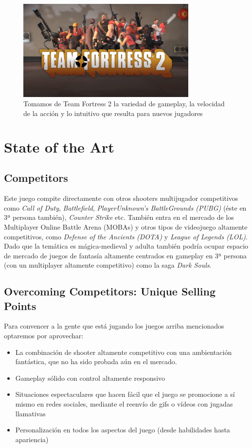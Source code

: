 \documentclass[12pt]{report}
\begin{document}
\begin{figure}[h]
    \centering
    \includegraphics[width=0.8\textwidth]{tf2}
    \caption{Tomamos de Team Fortress 2 la variedad de gameplay, la velocidad de la acción y lo intuitivo que resulta para nuevos jugadores}
\end{figure}

\section{State of the Art}

\subsection{Competitors}
Este juego compite directamente con otros shooters multijugador competitivos como \textit{Call of Duty}, \textit{Battlefield}, \textit{PlayerUnknown's BattleGrounds (PUBG)} (éste en 3ª persona también), \textit{Counter Strike} etc. También entra en el mercado de los Multiplayer Online Battle Arena (MOBAs) y otros tipos de videojuego altamente competitivos, como \textit{Defense of the Ancients (DOTA)} y \textit{League of Legends (LOL)}. Dado que la temática es mágica-medieval y adulta también podría ocupar espacio de mercado de juegos de fantasía altamente centrados en gameplay en 3ª persona (con un multiplayer altamente competitivo) como la saga \textit{Dark Souls}.

\subsection{Overcoming Competitors: Unique Selling Points}
Para convencer a la gente que está jugando los juegos arriba mencionados optaremos por aprovechar:

\begin{itemize}
\item La combinación de shooter altamente competitivo con una ambientación fantástica, que no ha sido probada aún en el mercado.
\item Gameplay sólido con control altamente responsivo
\item Situaciones espectaculares que hacen fácil que el juego se promocione a sí mismo en redes sociales, mediante el reenvío de gifs o vídeos con jugadas llamativas
\item Personalización en todos los aspectos del juego (desde habilidades hasta apariencia)
\end{itemize}
\end{document}
